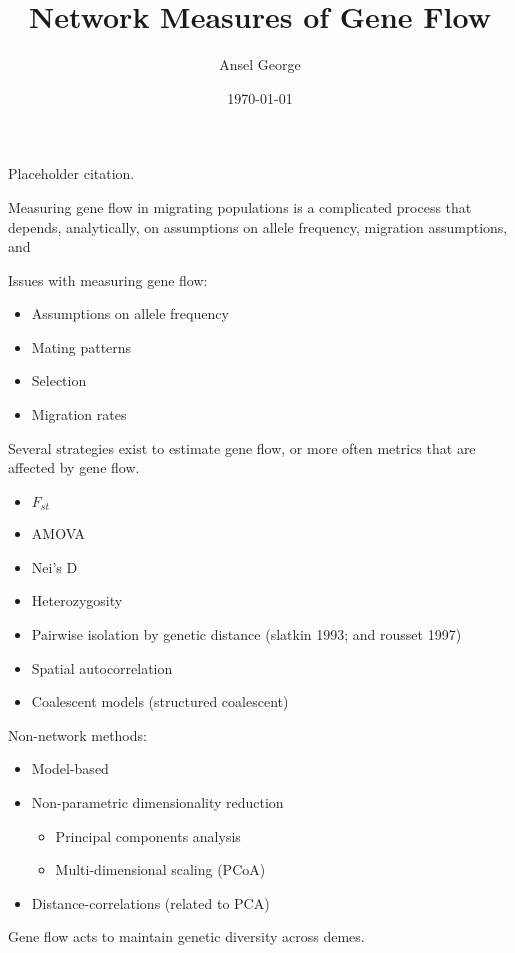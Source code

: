 \documentclass[10pt]{article}
\title{Network Measures of Gene Flow}
\author{Ansel George}
\date{\today}
\begin{document}
\maketitle
{}

Placeholder citation.~\cite{corander_bayesian_nodate}

Measuring gene flow in migrating populations is a complicated process that
depends, analytically, on assumptions on allele frequency, migration
assumptions, and 

Issues with measuring gene flow:
\begin{itemize}
  \item Assumptions on allele frequency
  \item Mating patterns
  \item Selection
  \item Migration rates
\end{itemize}

Several strategies exist to estimate gene flow, or more often metrics that are
affected by gene flow.


\begin{itemize}
  \item $F_{st}$
  \item AMOVA
  \item Nei's D
  \item Heterozygosity
  \item Pairwise isolation by genetic distance (slatkin 1993; and rousset 1997)
  \item Spatial autocorrelation
  \item Coalescent models (structured coalescent)
\end{itemize}


Non-network methods:

\begin{itemize}
  \item Model-based
  \item Non-parametric dimensionality reduction
    \begin{itemize}
      \item Principal components analysis
      \item Multi-dimensional scaling (PCoA)
    \end{itemize}
  \item Distance-correlations (related to PCA)
\end{itemize}

Gene flow acts to maintain genetic diversity across demes.
\end{document}

